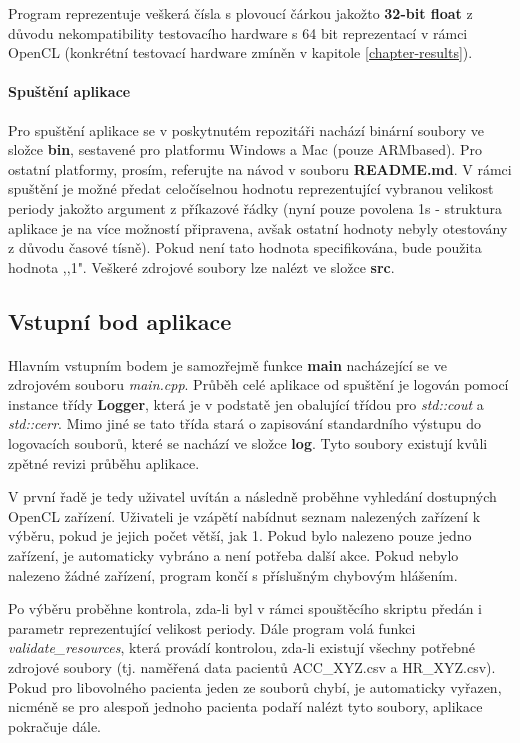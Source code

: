 \documentclass[12pt, a4paper]{article}
\begin{document}
Program reprezentuje veškerá čísla s plovoucí čárkou jakožto \textbf{32-bit float} z důvodu nekompatibility testovacího hardware s 64 bit reprezentací v rámci OpenCL (konkrétní testovací hardware zmíněn v kapitole \ref{chapter-results}).


\paragraph{Spuštění aplikace} Pro spuštění aplikace se v poskytnutém repozitáři nachází binární soubory ve složce \textbf{bin}, sestavené pro platformu Windows a Mac (pouze ARM\-based).
Pro ostatní platformy, prosím, referujte na návod v souboru \textbf{README.md}.
V rámci spuštění je možné předat celočíselnou hodnotu reprezentující vybranou velikost periody jakožto argument z příkazové řádky (nyní pouze povolena 1s - struktura aplikace je na více možností připravena, avšak ostatní hodnoty nebyly otestovány z důvodu časové tísně).
Pokud není tato hodnota specifikována, bude použita hodnota ,,1".
Veškeré zdrojové soubory lze nalézt ve složce \textbf{src}. 

 
\subsection{Vstupní bod aplikace}

\paragraph{} Hlavním vstupním bodem je samozřejmě funkce \textbf{main} nacházející se ve zdrojovém souboru \textit{main.cpp}.
Průběh celé aplikace od spuštění je logován pomocí instance třídy \textbf{Logger}, která je v podstatě jen obalující třídou pro \textit{std::cout} a \textit{std::cerr}.
Mimo jiné se tato třída stará o zapisování standardního výstupu do logovacích souborů, které se nachází ve složce \textbf{log}.
Tyto soubory existují kvůli zpětné revizi průběhu aplikace. 

V první řadě je tedy uživatel uvítán a následně proběhne vyhledání dostupných OpenCL zařízení. 
Uživateli je vzápětí nabídnut seznam nalezených zařízení k výběru, pokud je jejich počet větší, jak 1.
Pokud bylo nalezeno pouze jedno zařízení, je automaticky vybráno a není potřeba další akce.
Pokud nebylo nalezeno žádné zařízení, program končí s příslušným chybovým hlášením.

Po výběru proběhne kontrola, zda-li byl v rámci spouštěcího skriptu předán i parametr reprezentující velikost periody. 
Dále program volá funkci \textit{validate\_resources}, která provádí kontrolou, zda-li existují všechny potřebné zdrojové soubory (tj. naměřená data pacientů ACC\_XYZ.csv a HR\_XYZ.csv).
Pokud pro libovolného pacienta jeden ze souborů chybí, je automaticky vyřazen, nicméně se pro alespoň jednoho pacienta podaří nalézt tyto soubory, aplikace pokračuje dále.
\end{document}
